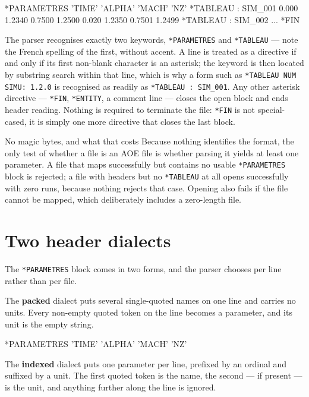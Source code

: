 \documentclass[11pt,a4paper,oneside]{report}
\newcommand{\code}[1]{\texttt{#1}}
\begin{document}
\begin{aoecode}
*PARAMETRES
 'TIME'   'ALPHA'  'MACH'  'NZ'
*TABLEAU : SIM_001
 0.000 1.2340 0.7500 1.2500
 0.020 1.2350 0.7501 1.2499
*TABLEAU : SIM_002
 ...
*FIN
\end{aoecode}

The parser recognises exactly two keywords, \code{*PARAMETRES} and
\code{*TABLEAU} --- note the French spelling of the first, without accent. A line
is treated as a directive if and only if its first non-blank character is an
asterisk; the keyword is then located by substring search within that line, which
is why a form such as \code{*TABLEAU NUM SIMU: 1.2.0} is recognised as readily as
\code{*TABLEAU : SIM\_001}. Any other asterisk directive --- \code{*FIN},
\code{*ENTITY}, a comment line --- closes the open block and ends header reading.
Nothing is required to terminate the file: \code{*FIN} is not special-cased, it
is simply one more directive that closes the last block.

\begin{aoenote}{No magic bytes, and what that costs}
Because nothing identifies the format, the only test of whether a file is an AOE
file is whether parsing it yields at least one parameter. A file that maps
successfully but contains no usable \code{*PARAMETRES} block is rejected; a file
with headers but no \code{*TABLEAU} at all opens successfully with zero runs,
because nothing rejects that case. Opening also fails if the file cannot be
mapped, which deliberately includes a zero-length file.
\end{aoenote}

\section{Two header dialects}

The \code{*PARAMETRES} block comes in two forms, and the parser chooses per line
rather than per file.

The \textbf{packed} dialect puts several single-quoted names on one line and
carries no units. Every non-empty quoted token on the line becomes a parameter,
and its unit is the empty string.

\begin{aoecode}
*PARAMETRES
 'TIME'   'ALPHA'   'MACH'   'NZ'
\end{aoecode}

The \textbf{indexed} dialect puts one parameter per line, prefixed by an ordinal
and suffixed by a unit. The first quoted token is the name, the second --- if
present --- is the unit, and anything further along the line is ignored.
\end{document}
